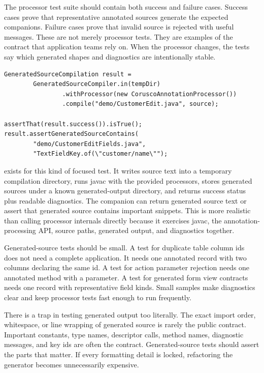 The processor test suite should contain both success and failure cases.
Success cases prove that representative annotated sources generate the
expected companions. Failure cases prove that invalid source is rejected with
useful messages. These are not merely processor tests. They are examples of
the contract that application teams rely on. When the processor changes, the
tests say which generated shapes and diagnostics are intentionally stable.

\begin{lstlisting}[caption={Generated-source compiler tests exercise the real javac path.}]
GeneratedSourceCompilation result =
        GeneratedSourceCompiler.in(tempDir)
                .withProcessor(new CoruscoAnnotationProcessor())
                .compile("demo/CustomerEdit.java", source);

assertThat(result.success()).isTrue();
result.assertGeneratedSourceContains(
        "demo/CustomerEditFields.java",
        "TextFieldKey.of(\"customer/name\"");
\end{lstlisting}

 exists for this kind of focused test. It writes
source text into a temporary compilation directory, runs javac with the
provided processors, stores generated sources under a known generated-output
directory, and returns success status plus readable diagnostics. The companion
 can return generated source text or assert
that generated source contains important snippets. This is more realistic than
calling processor internals directly because it exercises javac, the
annotation-processing API, source paths, generated output, and diagnostics
together.

Generated-source tests should be small. A test for duplicate table column ids
does not need a complete application. It needs one annotated record with two
columns declaring the same id. A test for action parameter rejection needs one
annotated method with a parameter. A test for generated form view contracts
needs one record with representative field kinds. Small samples make
diagnostics clear and keep processor tests fast enough to run frequently.

There is a trap in testing generated output too literally. The exact import
order, whitespace, or line wrapping of generated source is rarely the public
contract. Important constants, type names, descriptor calls, method names,
diagnostic messages, and key ids are often the contract. Generated-source
tests should assert the parts that matter. If every formatting detail is
locked, refactoring the generator becomes unnecessarily expensive.

